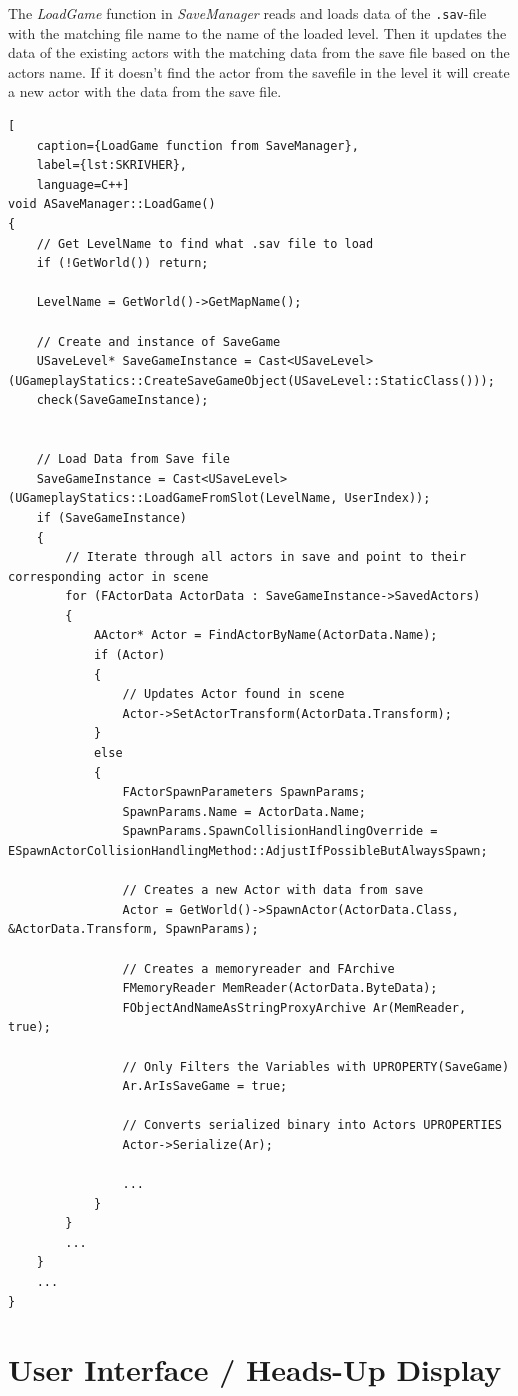 The \textit{LoadGame} function in \textit{SaveManager} reads and loads data of the \verb|.sav|-file with the matching file name to the name of the loaded level. Then it updates the data of the existing actors with the matching data from the save file based on the actors name. If it doesn't find the actor from the savefile in the level it will create a new actor with the data from the save file.


\begin{lstlisting}[
    caption={LoadGame function from SaveManager},
    label={lst:SKRIVHER},
    language=C++]
void ASaveManager::LoadGame()
{
	// Get LevelName to find what .sav file to load
	if (!GetWorld()) return;
	
	LevelName = GetWorld()->GetMapName();

	// Create and instance of SaveGame
	USaveLevel* SaveGameInstance = Cast<USaveLevel>(UGameplayStatics::CreateSaveGameObject(USaveLevel::StaticClass()));
	check(SaveGameInstance);
	

	// Load Data from Save file
	SaveGameInstance = Cast<USaveLevel>(UGameplayStatics::LoadGameFromSlot(LevelName, UserIndex));
	if (SaveGameInstance)
	{
		// Iterate through all actors in save and point to their corresponding actor in scene
		for (FActorData ActorData : SaveGameInstance->SavedActors)
		{
			AActor* Actor = FindActorByName(ActorData.Name);
			if (Actor)
			{
				// Updates Actor found in scene
			    Actor->SetActorTransform(ActorData.Transform);
			}
			else
			{
				FActorSpawnParameters SpawnParams;
				SpawnParams.Name = ActorData.Name;
				SpawnParams.SpawnCollisionHandlingOverride = ESpawnActorCollisionHandlingMethod::AdjustIfPossibleButAlwaysSpawn;
					
				// Creates a new Actor with data from save
				Actor = GetWorld()->SpawnActor(ActorData.Class, &ActorData.Transform, SpawnParams);
					
				// Creates a memoryreader and FArchive
				FMemoryReader MemReader(ActorData.ByteData);
				FObjectAndNameAsStringProxyArchive Ar(MemReader, true);

				// Only Filters the Variables with UPROPERTY(SaveGame)
				Ar.ArIsSaveGame = true;

				// Converts serialized binary into Actors UPROPERTIES
				Actor->Serialize(Ar);
					
				...
			}
		}
		...
	}
	...
}
\end{lstlisting}

\section{User Interface / Heads-Up Display} \label{HUD_implementation}


